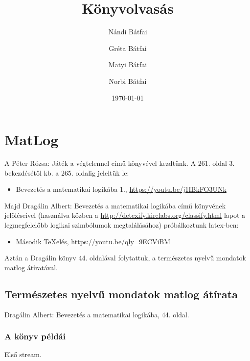 \documentclass{article}
\title{K\"onyvolvas\'as}
\date{\today}
\author{N\'andi B\'atfai \and Gr\'eta B\'atfai  \and Matyi B\'atfai  \and Norbi B\'atfai }
\begin{document}
\maketitle

\section{MatLog}

A Péter Rózsa: Játék a végtelennel című könyvével kezdtünk. A 261. oldal 3. bekezdésétől kb. a 265. oldalig jeleltük le:

\begin{itemize}
\item
Bevezetés a matematikai logikába 1., \url{https://youtu.be/j1IBkFO3UNk}
 \end{itemize}
 
Majd Dragálin Albert: Bevezetés a matematikai logikába című könyvének jelöléseivel (használva közben a \url{http://detexify.kirelabs.org/classify.html} lapot a legmegfelelőbb logikai szimbólumok megtalálásához) próbálkoztunk latex-ben:
\begin{itemize}
\item
Második TeXelés, \url{https://youtu.be/qly_9ECViBM}
 \end{itemize}

Aztán a Dragálin könyv 44. oldalával folytattuk, a természetes nyelvű mondatok matlog átíratával.

\subsection{Természetes nyelvű mondatok matlog átírata}

Dragálin Albert: Bevezetés a matematikai logikába, 44. oldal.

\subsubsection{A könyv példái} 
 
Első stream.
 
\end{document}
